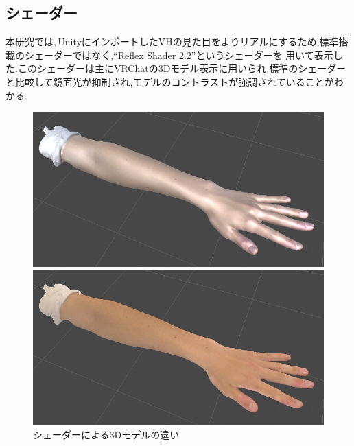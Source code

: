\documentclass{ltjsreport}
\begin{document}
		\subsection{シェーダー}
			本研究では,\,UnityにインポートしたVHの見た目をよりリアルにするため,標準搭載のシェーダーではなく,``Reflex Shader 2.2''というシェーダーを
			用いて表示した.このシェーダーは主にVRChatの3Dモデル表示に用いられ,標準のシェーダーと比較して鏡面光が抑制され,モデルのコントラストが強調されていることがわかる.
			\begin{figure}[H]
			\centering
			\begin{minipage}{0.4\columnwidth}
			\centering
			\includegraphics[width = \columnwidth]{../figs/NomalShader.png}
			\end{minipage}
			\hspace{0.04\columnwidth}
			\begin{minipage}{0.4\columnwidth}
			\centering
			\includegraphics[width = \columnwidth]{../figs/ReflexShader.png}
			\end{minipage}
			\caption{シェーダーによる3Dモデルの違い}
			\label{fig:Shader}
			\end{figure}
\vspace{-15pt}
\end{document}
